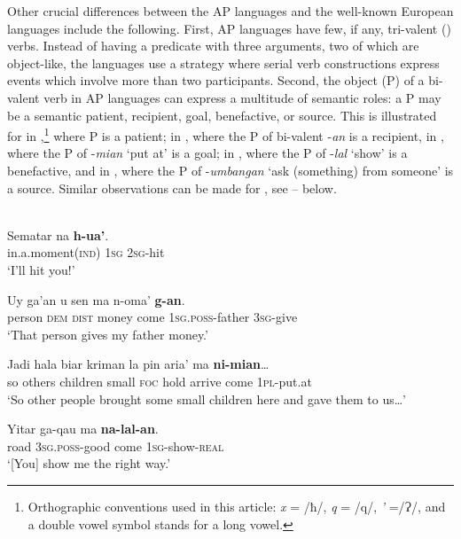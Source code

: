 \documentclass[output=paper]{LSP/langsci}
\begin{document}
Other crucial differences between the AP languages and the well-known European languages include the following. First, AP languages have few, if any, tri-valent () verbs. Instead of having a predicate with three arguments, two of which are object-like, the languages use a strategy where serial verb constructions express events which involve more than two participants. Second, the object (P) of a bi-valent verb in AP languages can express a multitude of semantic roles: a P may be a semantic patient, recipient, goal, benefactive, or source. This is illustrated for  in ,\footnote{Orthographic conventions used in this article: \textit{x} = /ħ/, \textit{q} = /q/, \textit{’} =/Ɂ/, and a double vowel symbol stands for a long vowel.} where P
is a patient; in , where the P of bi-valent -\textit{an} is a
recipient, in , where the P of -\textit{mian} ‘put at’ is a goal;
in , where the P of -\textit{lal} ‘show’ is a benefactive, and in
, where the P of -\textit{umbangan} ‘ask (something) from someone’
is a source. Similar observations can be made for , see -- below.

\ea {}\\
\ea\label{03-kl-ex:1}
\gll Sematar na \textbf{h-ua’}.\\
in.a.moment(\textsc{ind}) 1\textsc{sg} 2\textsc{sg}-hit\\
\glt ‘I’ll hit you!’

\ex\label{03-kl-ex:2}
\gll Uy ga’an u sen ma n-oma’ \textbf{g-an}.\\
person \textsc{dem} \textsc{dist} money come 1\textsc{sg}.\textsc{poss}-father 3\textsc{sg}-give\\
\glt ‘That person gives my father money.’

\ex
\label{03-kl-ex:3}
\gll Jadi hala biar kriman la pin aria’ ma \textbf{ni-mian}\ldots\\
so others children small \textsc{foc} hold arrive come 1\textsc{pl}-put.at\\
\glt ‘So other people brought some small children here and gave them to us\ldots ’

\ex
\label{03-kl-ex:4}
\gll Yitar ga-qau ma \textbf{na-lal-an}.\\
road 3\textsc{sg}.\textsc{poss}-good come 1\textsc{sg}-show-\textsc{real}\\
\glt ‘[You] show me the right way.’
\end{document}
